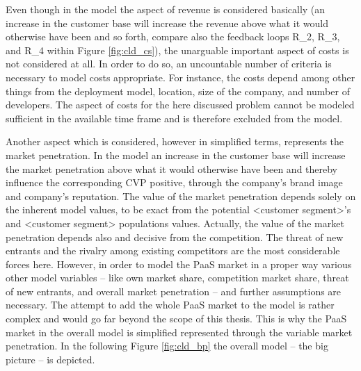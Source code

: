 Even though in the model the aspect of revenue is considered basically (an increase in the customer base will increase the revenue above what it would otherwise have been and so forth, compare also the feedback loops R\_2, R\_3, and R\_4 within Figure \ref{fig:cld_cs}), the unarguable important aspect of costs is not considered at all. In order to do so, an uncountable number of criteria is necessary to model costs appropriate. For instance, the costs depend among other things from the deployment model, location, size of the company, and number of developers. The aspect of costs for the here discussed problem cannot be modeled sufficient in the available time frame and is therefore excluded from the model.

Another aspect which is considered, however in simplified terms, represents the market penetration. In the model an increase in the customer base will increase the market penetration above what it would otherwise have been and thereby influence the corresponding \ac{CVP} positive, through the company's brand image and company's reputation. The value of the market penetration depends solely on the inherent model values, to be exact from the potential <customer segment>'s and <customer segment> populations values. Actually, the value of the market penetration depends also and decisive from the competition. The threat of new entrants and the rivalry among existing competitors \citep[pp. 80-82, 85-86]{Porter2008} are the most considerable forces here. However, in order to model the \ac{PaaS} market in a proper way various other model variables -- like own market share, competition market share, threat of new entrants, and overall market penetration -- and further assumptions are necessary. The attempt to add the whole \ac{PaaS} market to the model is rather complex and would go far beyond the scope of this thesis. This is why the \ac{PaaS} market in the overall model is simplified represented through the variable market penetration. In the following Figure \ref{fig:cld_bp} the overall model -- the big picture -- is depicted.

\newpage

